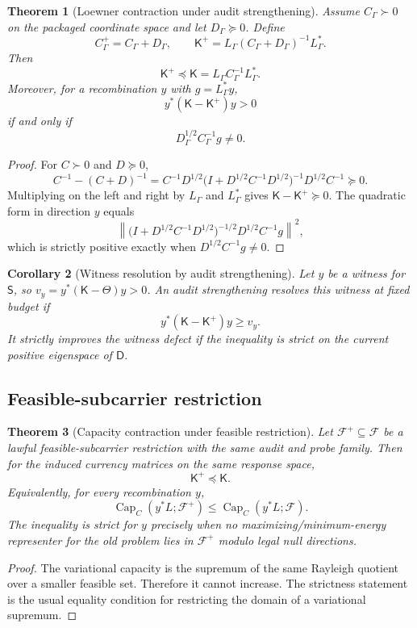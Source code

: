 \documentclass[11pt]{article}
\newtheorem{theorem}{Theorem}[section]
\newtheorem{corollary}[theorem]{Corollary}
\newcommand{\K}{\mathsf K}
\newcommand{\D}{\mathsf D}
\newcommand{\Sstate}{\mathsf S}
\begin{document}
\begin{theorem}[Loewner contraction under audit strengthening]
Assume $C_\Gamma\succ0$ on the packaged coordinate space and let $D_\Gamma\succeq0$. Define
\[
  C_\Gamma^+=C_\Gamma+D_\Gamma,
  \qquad
  \K^+=L_\Gamma(C_\Gamma+D_\Gamma)^{-1}L_\Gamma^*.
\]
Then
\[
  \boxed{\K^+\preceq \K=L_\Gamma C_\Gamma^{-1}L_\Gamma^*.}
\]
Moreover, for a recombination $y$ with $g=L_\Gamma^*y$,
\[
  y^*(\K-\K^+)y>0
\]
if and only if
\[
  D_\Gamma^{1/2}C_\Gamma^{-1}g\ne0.
\]
\end{theorem}

\begin{proof}
For $C\succ0$ and $D\succeq0$,
\[
  C^{-1}-(C+D)^{-1}
  =C^{-1}D^{1/2}\bigl(I+D^{1/2}C^{-1}D^{1/2}\bigr)^{-1}D^{1/2}C^{-1}
  \succeq0.
\]
Multiplying on the left and right by $L_\Gamma$ and $L_\Gamma^*$ gives $\K-\K^+\succeq0$. The quadratic form in direction $y$ equals
\[
  \left\|\bigl(I+D^{1/2}C^{-1}D^{1/2}\bigr)^{-1/2}D^{1/2}C^{-1}g\right\|^2,
\]
which is strictly positive exactly when $D^{1/2}C^{-1}g\ne0$.
\end{proof}

\begin{corollary}[Witness resolution by audit strengthening]
Let $y$ be a witness for $\Sstate$, so $v_y=y^*(\K-\Theta)y>0$. An audit strengthening resolves this witness at fixed budget if
\[
  y^*(\K-\K^+)y\ge v_y.
\]
It strictly improves the witness defect if the inequality is strict on the current positive eigenspace of $\D$.
\end{corollary}

\subsection{Feasible-subcarrier restriction}

\begin{theorem}[Capacity contraction under feasible restriction]
Let $\mathcal F^+\subseteq\mathcal F$ be a lawful feasible-subcarrier restriction with the same audit and probe family. Then for the induced currency matrices on the same response space,
\[
  \boxed{\K^+\preceq\K.}
\]
Equivalently, for every recombination $y$,
\[
  \operatorname{Cap}_{C}(y^*L;\mathcal F^+)
  \le
  \operatorname{Cap}_{C}(y^*L;\mathcal F).
\]
The inequality is strict for $y$ precisely when no maximizing/minimum-energy representer for the old problem lies in $\mathcal F^+$ modulo legal null directions.
\end{theorem}

\begin{proof}
The variational capacity is the supremum of the same Rayleigh quotient over a smaller feasible set. Therefore it cannot increase. The strictness statement is the usual equality condition for restricting the domain of a variational supremum.
\end{proof}
\end{document}
